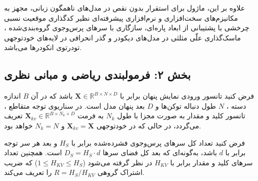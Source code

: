 علاوه بر این، ماژول  برای استقرار بدون نقص در مدل‌های ناهمگون زبانی، مجهز به مکانیزم‌های سخت‌افزاری و نرم‌افزاری پیشرفته‌ای نظیر کدگذاری موقعیت نسبی چرخشی  با پشتیبانی از ابعاد پاره‌ای، سازگاری با سرهای پرس‌وجوی گروه‌بندی‌شده ، ماسک‌گذاری علّی مثلثی در مدل‌های دیکودر  و گذر انحرافی  در لایه‌های خودتوجهی تودرتوی انکودرها  می‌باشد.

\subsection*{بخش ۲: فرمولبندی ریاضی و مبانی نظری }
فرض کنید تانسور ورودی نمایش پنهان برابر با $\mathbf{X} \in \mathbb{R}^{B \times N \times D}$ باشد که در آن $B$ اندازه دسته ، $N$ طول دنباله توکن‌ها  و $D$ بعد پنهان مدل  است. در سناریوی توجه متقاطع ، تانسور کلید و مقدار به صورت مجزا با طول $N_k$ به فرمت $\mathbf{X}_{kv} \in \mathbb{R}^{B \times N_k \times D}$ تعریف می‌گردد، در حالی که در خودتوجهی $\mathbf{X}_{kv} = \mathbf{X}$ و $N_k = N$ خواهد بود.

فرض کنید تعداد کل سرهای پرس‌وجوی فشرده‌شده برابر با $H_S$ و بعد هر سر توجه برابر با $d$ باشد، به‌گونه‌ای که بعد کل فضای سرها $D_S = H_S \cdot d$ است. همچنین تعداد سرهای کلید و مقدار برابر با $H_{KV}$ در نظر گرفته می‌شود ($1 \le H_{KV} \le H_S$) که ضریب اشتراک گروهی $R = H_S / H_{KV}$ را تعریف می‌کند.

